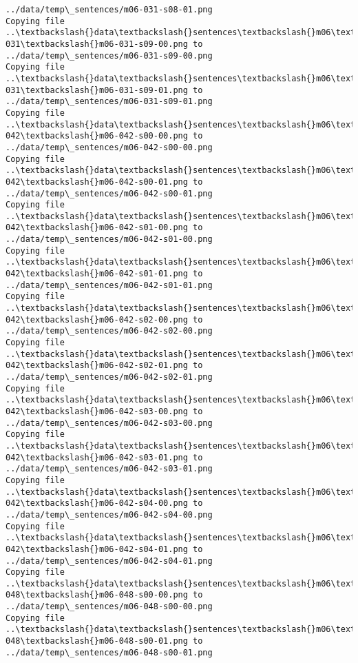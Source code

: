 \documentclass[11pt]{article}
\begin{document}
\begin{Verbatim}[commandchars=\\\{\}]
../data/temp\_sentences/m06-031-s08-01.png
Copying file ..\textbackslash{}data\textbackslash{}sentences\textbackslash{}m06\textbackslash{}m06-031\textbackslash{}m06-031-s09-00.png to
../data/temp\_sentences/m06-031-s09-00.png
Copying file ..\textbackslash{}data\textbackslash{}sentences\textbackslash{}m06\textbackslash{}m06-031\textbackslash{}m06-031-s09-01.png to
../data/temp\_sentences/m06-031-s09-01.png
Copying file ..\textbackslash{}data\textbackslash{}sentences\textbackslash{}m06\textbackslash{}m06-042\textbackslash{}m06-042-s00-00.png to
../data/temp\_sentences/m06-042-s00-00.png
Copying file ..\textbackslash{}data\textbackslash{}sentences\textbackslash{}m06\textbackslash{}m06-042\textbackslash{}m06-042-s00-01.png to
../data/temp\_sentences/m06-042-s00-01.png
Copying file ..\textbackslash{}data\textbackslash{}sentences\textbackslash{}m06\textbackslash{}m06-042\textbackslash{}m06-042-s01-00.png to
../data/temp\_sentences/m06-042-s01-00.png
Copying file ..\textbackslash{}data\textbackslash{}sentences\textbackslash{}m06\textbackslash{}m06-042\textbackslash{}m06-042-s01-01.png to
../data/temp\_sentences/m06-042-s01-01.png
Copying file ..\textbackslash{}data\textbackslash{}sentences\textbackslash{}m06\textbackslash{}m06-042\textbackslash{}m06-042-s02-00.png to
../data/temp\_sentences/m06-042-s02-00.png
Copying file ..\textbackslash{}data\textbackslash{}sentences\textbackslash{}m06\textbackslash{}m06-042\textbackslash{}m06-042-s02-01.png to
../data/temp\_sentences/m06-042-s02-01.png
Copying file ..\textbackslash{}data\textbackslash{}sentences\textbackslash{}m06\textbackslash{}m06-042\textbackslash{}m06-042-s03-00.png to
../data/temp\_sentences/m06-042-s03-00.png
Copying file ..\textbackslash{}data\textbackslash{}sentences\textbackslash{}m06\textbackslash{}m06-042\textbackslash{}m06-042-s03-01.png to
../data/temp\_sentences/m06-042-s03-01.png
Copying file ..\textbackslash{}data\textbackslash{}sentences\textbackslash{}m06\textbackslash{}m06-042\textbackslash{}m06-042-s04-00.png to
../data/temp\_sentences/m06-042-s04-00.png
Copying file ..\textbackslash{}data\textbackslash{}sentences\textbackslash{}m06\textbackslash{}m06-042\textbackslash{}m06-042-s04-01.png to
../data/temp\_sentences/m06-042-s04-01.png
Copying file ..\textbackslash{}data\textbackslash{}sentences\textbackslash{}m06\textbackslash{}m06-048\textbackslash{}m06-048-s00-00.png to
../data/temp\_sentences/m06-048-s00-00.png
Copying file ..\textbackslash{}data\textbackslash{}sentences\textbackslash{}m06\textbackslash{}m06-048\textbackslash{}m06-048-s00-01.png to
../data/temp\_sentences/m06-048-s00-01.png

\end{Verbatim}
\end{document}
